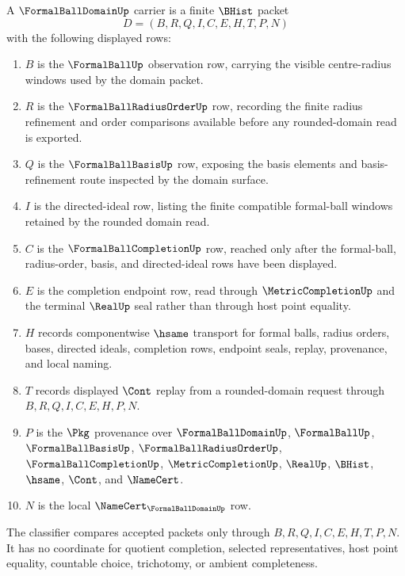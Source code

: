\begin{definition}\label{def:formal-ball-domain-carrier}
A $\FormalBallDomainUp$ carrier is a finite $\BHist$ packet
$$
D=(B,R,Q,I,C,E,H,T,P,N)
$$
with the following displayed rows:
\begin{enumerate}
\item $B$ is the $\FormalBallUp$ observation row, carrying the visible centre-radius windows used by the domain packet.
\item $R$ is the $\FormalBallRadiusOrderUp$ row, recording the finite radius refinement and order comparisons available before any rounded-domain read is exported.
\item $Q$ is the $\FormalBallBasisUp$ row, exposing the basis elements and basis-refinement route inspected by the domain surface.
\item $I$ is the directed-ideal row, listing the finite compatible formal-ball windows retained by the rounded domain read.
\item $C$ is the $\FormalBallCompletionUp$ row, reached only after the formal-ball, radius-order, basis, and directed-ideal rows have been displayed.
\item $E$ is the completion endpoint row, read through $\MetricCompletionUp$ and the terminal $\RealUp$ seal rather than through host point equality.
\item $H$ records componentwise $\hsame$ transport for formal balls, radius orders, bases, directed ideals, completion rows, endpoint seals, replay, provenance, and local naming.
\item $T$ records displayed $\Cont$ replay from a rounded-domain request through $B,R,Q,I,C,E,H,P,N$.
\item $P$ is the $\Pkg$ provenance over $\FormalBallDomainUp$, $\FormalBallUp$, $\FormalBallBasisUp$, $\FormalBallRadiusOrderUp$, $\FormalBallCompletionUp$, $\MetricCompletionUp$, $\RealUp$, $\BHist$, $\hsame$, $\Cont$, and $\NameCert$.
\item $N$ is the local $\NameCert_{\FormalBallDomainUp}$ row.
\end{enumerate}
The classifier compares accepted packets only through $B,R,Q,I,C,E,H,T,P,N$. It has no coordinate for quotient completion, selected representatives, host point equality, countable choice, trichotomy, or ambient completeness.
\end{definition}

